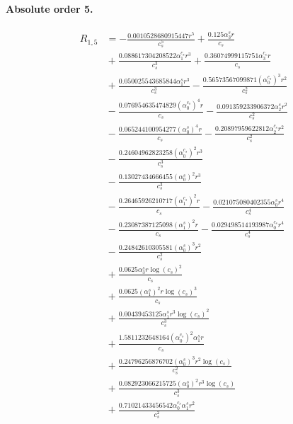 \documentclass[10pt]{article}
\begin{document}
\paragraph{Absolute order 5.}
\begin{align*}
R_{1,5} &=  - \frac{0.0010528680915447 r^{5}}{c_{s}^{5}} + \frac{0.125 \alpha_{3}^s r}{c_{s}} \\
&{}  + \frac{0.088617304208522 \alpha_{1}^{c_s} r^{3}}{c_{s}^{3}} + \frac{0.36074999115751 \alpha_{3}^{c_s} r}{c_{s}} \\
&{}  + \frac{0.050025543685844 \alpha_{1}^s r^{3}}{c_{s}^{3}} - \frac{0.56573567099871 \left(\alpha_{0}^{c_s}\right)^{3} r^{2}}{c_{s}^{2}} \\
&{}  - \frac{0.076954635474829 \left(\alpha_{0}^{c_s}\right)^{4} r}{c_{s}} - \frac{0.091359233906372 \alpha_{2}^s r^{2}}{c_{s}^{2}} \\
&{}  - \frac{0.065244100954277 \left(\alpha_{0}^s\right)^{4} r}{c_{s}} - \frac{0.20897959622812 \alpha_{2}^{c_s} r^{2}}{c_{s}^{2}} \\
&{}  - \frac{0.24604962823258 \left(\alpha_{0}^{c_s}\right)^{2} r^{3}}{c_{s}^{3}} \\
&{}  - \frac{0.13027434666455 \left(\alpha_{0}^s\right)^{2} r^{3}}{c_{s}^{3}} \\
&{}  - \frac{0.26465926210717 \left(\alpha_{1}^{c_s}\right)^{2} r}{c_{s}} - \frac{0.021075080402355 \alpha_{0}^s r^{4}}{c_{s}^{4}} \\
&{}  - \frac{0.23087387125098 \left(\alpha_{1}^s\right)^{2} r}{c_{s}} - \frac{0.029498514193987 \alpha_{0}^{c_s} r^{4}}{c_{s}^{4}} \\
&{}  - \frac{0.24842610305581 \left(\alpha_{0}^s\right)^{3} r^{2}}{c_{s}^{2}} \\
&{}  + \frac{0.0625 \alpha_{3}^s r \log{\left(c_{s} \right)}^{2}}{c_{s}} \\
&{}  + \frac{0.0625 \left(\alpha_{1}^s\right)^{2} r \log{\left(c_{s} \right)}^{3}}{c_{s}} \\
&{}  + \frac{0.00439453125 \alpha_{1}^s r^{3} \log{\left(c_{s} \right)}^{2}}{c_{s}^{3}} \\
&{}  + \frac{1.5811232648164 \left(\alpha_{0}^{c_s}\right)^{2} \alpha_{1}^s r}{c_{s}} \\
&{}  + \frac{0.24796256876702 \left(\alpha_{0}^s\right)^{3} r^{2} \log{\left(c_{s} \right)}}{c_{s}^{2}} \\
&{}  + \frac{0.082923066215725 \left(\alpha_{0}^s\right)^{2} r^{3} \log{\left(c_{s} \right)}}{c_{s}^{3}} \\
&{}  + \frac{0.71021433456542 \alpha_{0}^{c_s} \alpha_{1}^s r^{2}}{c_{s}^{2}} \\

\end{align*}
\end{document}
